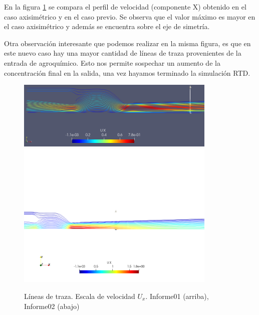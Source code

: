 \documentclass{article}
\begin{document}
\bigskip
En la figura \ref{fig:sF_Ux} se compara el perfil de velocidad (componente X) obtenido en el caso axisimétrico y en el caso previo. Se observa que el valor máximo es mayor en el caso axisimétrico y además se encuentra sobre el eje de simetría.\par 
Otra observación interesante que podemos realizar en la misma figura, es que en este nuevo caso hay una mayor cantidad de líneas de traza provenientes de la entrada de agroquímico. Esto nos permite sospechar un aumento de la concentración final en la salida, una vez hayamos terminado la simulación RTD.
\begin{figure}[h!]
	\centering
	\includegraphics[width=0.85\textwidth]{../Informe01/Figuras/stream_vel.png}
	\includegraphics[width=0.85\textwidth]{Figuras/04_traza.png}
	\caption{Líneas de traza. Escala de velocidad $U_x$. Informe01 (arriba), Informe02 (abajo)}
	\label{fig:sF_Ux}
\end{figure}

\newpage
\end{document}
